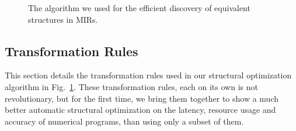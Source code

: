\begin{figure}[ht]
    \centering
    \begin{algorithmic}
            \EndFor
        \EndFor
    \EndWhile
\EndFunction
    \end{algorithmic}
    \caption{%
        The algorithm we used for the efficient discovery of equivalent
        structures in MIRs.
    }
    \label{alg:optimize}
\end{figure}

\subsection{Transformation Rules}
\label{sub:transformation_rules}

This section details the transformation rules used in our structural
optimization algorithm in Fig.~\ref{alg:optimize}.  These transformation
rules, each on its own is not revolutionary, but for the first time, we bring
them together to show a much better automatic structural optimization on the
latency, resource usage and accuracy of numerical programs, than using only a
subset of them.

